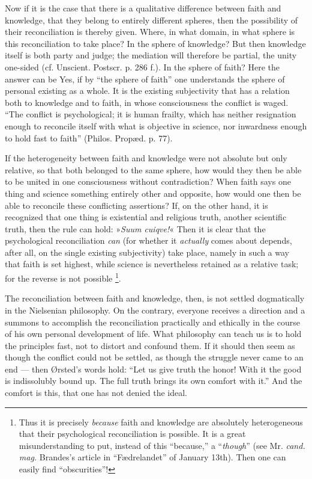 \documentclass[12pt,a4paper]{book}
\newcommand{\opage}[1]{\marginnote{\footnotesize\textit{[#1]}}}
\begin{document}
Now if it is the case that there is a qualitative
difference between faith and knowledge, that they belong to entirely different
spheres, then the possibility of their
reconciliation is thereby given. Where, in what domain, in what sphere
\opage{41}\setcounter{footnote}{0}%
is this reconciliation to take place? In the sphere of knowledge? But
then knowledge itself is both party and judge; the mediation will
therefore be partial, the unity one-sided (cf. Unscient. Postscr.
p. 286 f.). In the sphere of faith? Here the answer can be Yes,
if by ``the sphere of faith'' one understands the sphere of personal
existing as a whole. It is the existing subjectivity
that has a relation both to knowledge and to faith, in
whose consciousness the conflict is waged. ``The conflict is psychological; it
is human frailty, which has neither resignation
enough to reconcile itself with what is objective in science, nor inwardness
enough to hold fast to faith'' (Philos. Propæd. p. 77).

If the heterogeneity between faith and knowledge were not
absolute but only relative, so that both belonged to the same sphere,
how would they then be able to be united in one consciousness without
contradiction? When faith says one thing and science something entirely
other and opposite, how would one then be able to reconcile these
conflicting assertions? If, on the other hand, it is recognized that one thing is existential
and religious truth, another scientific truth, then the rule can
hold: »\textit{Suum cuiqve!}« Then it is clear that the psychological
reconciliation \emph{can} (for whether it \emph{actually} comes about
depends, after all, on the single existing subjectivity) take place,
namely in such a way that faith is set highest, while science
is nevertheless retained as a relative task; for the reverse is
not possible%
\footnote{Thus it is precisely \emph{because} faith and knowledge are absolutely heterogeneous that their
psychological reconciliation is possible. It is a great misunderstanding to put, instead of
this ``because,'' a ``\emph{though}'' (see Mr. \textit{cand. mag.} Brandes's
article in ``Fædrelandet'' of January 13th). Then one can easily
find ``obscurities''!}.

The reconciliation between faith and knowledge, then, is not settled
dogmatically in the Nielsenian philosophy. On the contrary, everyone receives
a direction and a summons to accomplish the reconciliation practically and ethically
in the course of his own personal development of life.
What philosophy can teach us is to hold the principles fast,
\opage{42}\setcounter{footnote}{0}%
not to distort and confound them. If it should then seem as
though the conflict could not be settled, as though the struggle never came to an end ---
then Ørsted's words hold: ``Let us give truth the honor!
With it the good is indissolubly bound up. The full truth
brings its own comfort with it.'' And the comfort is this, that one
has not denied the ideal.
\end{document}

